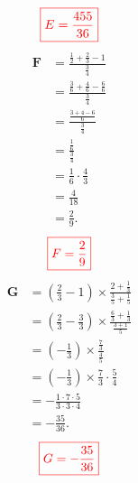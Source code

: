 \documentclass[12pt,a4paper]{article}
\begin{document}
$$\textcolor{red}{\boxed{E=\frac{455}{36}}}$$
\begin{align*}
\textbf{F} &= \frac{\frac{1}{2} + \frac{2}{3} - 1}{\frac{3}{4}} \\ 
           &= \frac{\frac{3}{6} + \frac{4}{6} - \frac{6}{6}}{\frac{3}{4}} \\ 
           &= \frac{\frac{3 + 4 - 6}{6}}{\frac{3}{4}} \\ 
           &= \frac{\frac{1}{6}}{\frac{3}{4}} \\ 
           &= \frac{1}{6} \cdot \frac{4}{3} \\ 
           &= \frac{4}{18} \\ 
           &= \frac{2}{9}.
\end{align*}
$$\textcolor{red}{\boxed{F=\frac{2}{9}}}$$
\begin{align*}
\textbf{G} &= \left(\frac{2}{3} - 1 \right) \times \frac{2 + \frac{1}{3}}{\frac{3}{5} + \frac{1}{5}} \\ 
           &= \left(\frac{2}{3} - \frac{3}{3} \right) \times \frac{\frac{6}{3} + \frac{1}{3}}{\frac{3 + 1}{5}} \\ 
           &= \left(-\frac{1}{3} \right) \times \frac{\frac{7}{3}}{\frac{4}{5}} \\ 
           &= \left(-\frac{1}{3} \right) \times \frac{7}{3} \cdot \frac{5}{4} \\ 
           &= -\frac{1 \cdot 7 \cdot 5}{3 \cdot 3 \cdot 4} \\ 
           &= -\frac{35}{36}.
\end{align*}
$$\textcolor{red}{\boxed{G=-\frac{35}{36}}}$$
\end{document}
